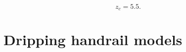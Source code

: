     \begin{equation}
        z_c = 5.5.
        \label{eq:z_critical_model}
    \end{equation}

\section{Dripping handrail models}











